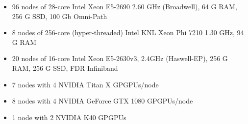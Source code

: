 \documentclass[landscape,a0paper,fontscale=0.285]{baposter} %
\newcommand{\compresslist}{ %
\setlength{\itemsep}{1pt}
\setlength{\parskip}{0pt}
\setlength{\parsep}{0pt}
}
\begin{document}
\begin{poster}
{\colorbox[HTML]{cdb87d}{}
\begin{itemize}\compresslist
\item 96 nodes of 28-core Intel Xeon E5-2690 2.60 GHz (Broadwell), 64 G RAM, 256 G SSD, 100 Gb Omni-Path
\item 8 nodes of 256-core (hyper-threaded) Intel KNL Xeon Phi 7210 1.30 GHz, 94 G RAM
\end{itemize}

\colorbox[HTML]{cdb87d}{}
\begin{itemize}\compresslist
\item 20 nodes of 16-core Intel Xeon E5-2630v3, 2.4GHz (Haswell-EP), 256 G RAM, 256 G SSD, FDR Infiniband
\end{itemize}

\colorbox[HTML]{cdb87d}{}
\begin{itemize}\compresslist
\item 7 nodes with 4 NVIDIA Titan X GPGPUs/node
\item 8 nodes with 4 NVIDIA GeForce GTX 1080 GPGPUs/node
\item 1 node with 2 NVIDIA K40 GPGPUs
\end{itemize}

}

\end{poster}
\newpage

\end{document}
